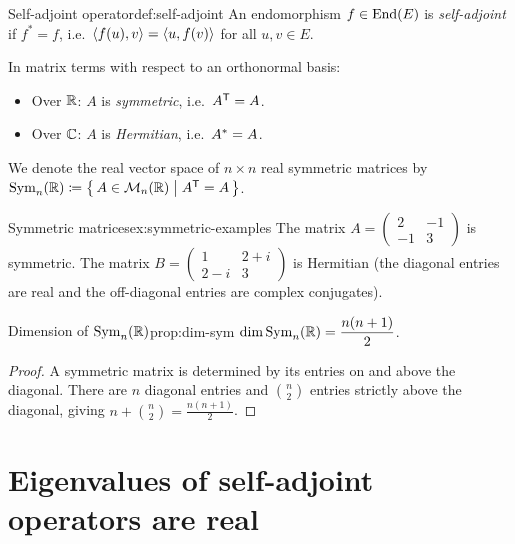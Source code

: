 \begin{definition}{Self-adjoint operator}{def:self-adjoint}
An endomorphism $f\in\operatorname{End}(E)$ is \emph{self-adjoint} if $f^* = f$,
i.e.\ $\langle f(u),v\rangle = \langle u,f(v)\rangle$ for all $u,v\in E$.

In matrix terms with respect to an orthonormal basis:
\begin{itemize}
  \item Over ${\mathbb{R}}$: $A$ is \emph{symmetric},
    i.e.\ ${A}^{\mathsf{T}} = A$.
  \item Over ${\mathbb{C}}$: $A$ is \emph{Hermitian},
    i.e.\ ${A}^{*} = A$.
\end{itemize}

We denote the real vector space of $n\times n$ real symmetric matrices by
$\operatorname{Sym}_n({\mathbb{R}})\coloneqq\left\{\,A\in\mathcal{M}_n({\mathbb{R}})\;\middle|\;{A}^{\mathsf{T}}=A\,\right\}$.
\end{definition}

\begin{example}{Symmetric matrices}{ex:symmetric-examples}
The matrix
$A = \begin{pmatrix} 2 & -1 \\ -1 & 3 \end{pmatrix}$
is symmetric.  The matrix
$B = \begin{pmatrix} 1 & 2+i \\ 2-i & 3 \end{pmatrix}$
is Hermitian (the diagonal entries are real and the off-diagonal entries
are complex conjugates).
\end{example}

\begin{proposition}{Dimension of $\operatorname{Sym}_n({\mathbb{R}})$}{prop:dim-sym}
$\dim\operatorname{Sym}_n({\mathbb{R}}) = \dfrac{n(n+1)}{2}$.
\end{proposition}

\begin{proof}
A symmetric matrix is determined by its entries on and above the diagonal.
There are $n$ diagonal entries and $\binom{n}{2}$ entries strictly above
the diagonal, giving $n + \binom{n}{2} = \frac{n(n+1)}{2}$.
\end{proof}


\section{Eigenvalues of self-adjoint operators are real}%
\label{sec:eigenvalues-real}

